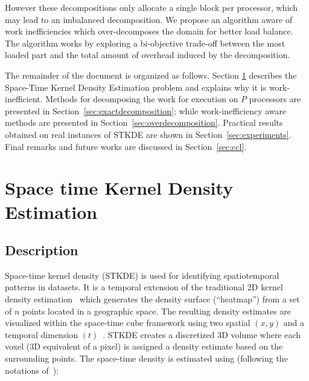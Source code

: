 \documentclass[10pt, conference, compsocconf]{IEEEtran}
\begin{document}
However these decompositions only allocate a single block per
processor, which may lead to an imbalanced decomposition. We propose
an algorithm aware of work inefficiencies which over-decomposes the
domain for better load balance. The algorithm works by exploring a
bi-objective trade-off between the most loaded part and the total
amount of overhead induced by the decomposition.

The remainder of the document is organized as follows.
Section \ref{sec:stkde} describes the Space-Time Kernel
Density Estimation problem and explains why it is
work-inefficient. Methods for decomposing the work for execution on
$P$ processors are presented in Section~\ref{sec:exactdecomposition};
while work-inefficiency aware methods are presented in
Section~\ref{sec:overdecomposition}. Practical results obtained on
real instances of STKDE are shown in
Section~\ref{sec:experiments}. Final remarks and future works are
discussed in Section~\ref{sec:ccl}.



\section{Space time Kernel Density Estimation}
\label{sec:stkde}

\subsection{Description}

Space-time kernel density (STKDE) is used for identifying
spatiotemporal patterns in datasets. It is a temporal
extension of the traditional 2D kernel density
estimation~\cite{Silverman86} which generates the density surface
(``heatmap'') from a set of $n$ points located in a geographic space. The resulting density
estimates are visualized within the space-time cube framework using two spatial $(x,
y)$ and a temporal dimension $(t)$~\cite{Nakaya10}. STKDE creates a discretized 3D
 volume where each voxel (3D equivalent of a pixel) is assigned a
density estimate based on the surrounding points. The space-time
density is estimated using (following the notations
of~\cite{Hohl16}):
\end{document}
